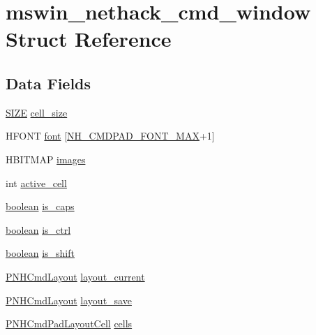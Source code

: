\hypertarget{structmswin__nethack__cmd__window}{\section{mswin\+\_\+nethack\+\_\+cmd\+\_\+window Struct Reference}
\label{structmswin__nethack__cmd__window}
}
\subsection*{Data Fields}
\begin{DoxyCompactItemize}
\item 
\hyperlink{global_8h_afd2537d19a3cb6556b0f727580ec6ee7}{S\+I\+Z\+E} \hyperlink{structmswin__nethack__cmd__window_aaf1f18d57dc3cf2e745df8fa84bbacc6}{cell\+\_\+size}
\item 
H\+F\+O\+N\+T \hyperlink{structmswin__nethack__cmd__window_a78cd956720dc8bbd93d177563c27a5d0}{font} \mbox{[}\hyperlink{mhcmd_8c_a85bf3f37ae0563a86d715a3fb7accaec}{N\+H\+\_\+\+C\+M\+D\+P\+A\+D\+\_\+\+F\+O\+N\+T\+\_\+\+M\+A\+X}+1\mbox{]}
\item 
H\+B\+I\+T\+M\+A\+P \hyperlink{structmswin__nethack__cmd__window_a5bd2743549a8fb8f1402eadf322beba1}{images}
\item 
int \hyperlink{structmswin__nethack__cmd__window_a2ef0bcb1c4f8861efd01cf5dd57eb421}{active\+\_\+cell}
\item 
\hyperlink{global_8h_a531b10dd351aa162d7dcccd1966308b8}{boolean} \hyperlink{structmswin__nethack__cmd__window_a474681414472e8c3ea58b258af3abc42}{is\+\_\+caps}
\item 
\hyperlink{global_8h_a531b10dd351aa162d7dcccd1966308b8}{boolean} \hyperlink{structmswin__nethack__cmd__window_aff2fb0876c6837b751726f8eea0c418f}{is\+\_\+ctrl}
\item 
\hyperlink{global_8h_a531b10dd351aa162d7dcccd1966308b8}{boolean} \hyperlink{structmswin__nethack__cmd__window_ad6fd9ac96bc191d831bbb6e73385af1e}{is\+\_\+shift}
\item 
\hyperlink{mhcmd_8c_aaff26e9507b2c94d8428960902cbaeb4}{P\+N\+H\+Cmd\+Layout} \hyperlink{structmswin__nethack__cmd__window_a831bb0bd75e68f9481f2ee8b7c13bdf5}{layout\+\_\+current}
\item 
\hyperlink{mhcmd_8c_aaff26e9507b2c94d8428960902cbaeb4}{P\+N\+H\+Cmd\+Layout} \hyperlink{structmswin__nethack__cmd__window_a6ce098bf49ef1d66ca15487b0df1817a}{layout\+\_\+save}
\item 
\hyperlink{mhcmd_8c_aaa8d2473a514ad73872a4cf1e1ce283b}{P\+N\+H\+Cmd\+Pad\+Layout\+Cell} \hyperlink{structmswin__nethack__cmd__window_a3ed8b7eff746d3659dea5e100607bda4}{cells}
\end{DoxyCompactItemize}


